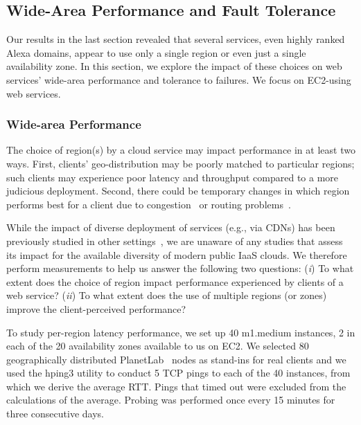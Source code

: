 \subsection{Wide-Area Performance and Fault Tolerance}
\label{cloud-measure-performance} 


Our results in the last section revealed that several services, even
highly ranked Alexa domains, appear to use only a single region or
even just a single availability zone.  In this section, we explore the
impact of these choices on web services' wide-area performance and
tolerance to failures.  We focus on EC2-using web services.


\subsubsection{Wide-area Performance} 


The choice of region(s) by a cloud service may impact performance in
at least two ways. First, clients' geo-distribution may
be poorly matched to particular regions; such clients may experience
poor latency and throughput compared to a more
judicious deployment. Second, there could be temporary changes in
which region performs best for a client due to 
congestion~\cite{akella2003empirical} or routing
problems~\cite{teixeira2004dynamics}.

While the impact of diverse deployment of services (e.g., via CDNs)
has been previously studied in other
settings~\cite{krishnan2009moving}, we are unaware of any studies that
assess its impact for the available diversity of modern public IaaS
clouds. We therefore perform measurements to help us answer the
following two questions: ({\em i}) To what extent does the choice of region
impact performance experienced by clients of a web service? ({\em ii}) To
what extent does the use of multiple regions (or zones) improve the
client-perceived performance?


  To study per-region latency
performance, we set up 40 m1.medium instances, 2 in each of the 20
availability zones available to us on EC2. 
We selected 80 geographically distributed
PlanetLab~\cite{planetlab} nodes as stand-ins for real clients and we
used the hping3 utility to conduct 5 TCP pings to each of the 40
instances, from which we derive the average RTT. Pings that timed out
were excluded from the calculations of the average.
Probing was performed once every 15 minutes for three consecutive days.

